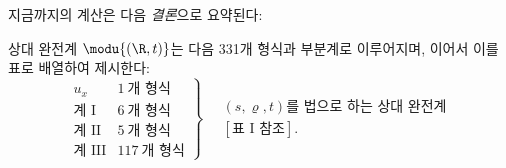 
지금까지의 계산은 다음 \emph{결론}으로 요약된다:

상대 완전계 $\modu{(\R,t)}$는 다음 331개 형식과 부분계로 이루어지며, 이어서 이를 표로 배열하여 제시한다:
\[
\left.
\begin{array}{lr}
u_x&1\ \text{개 형식}\\
\text{계 I}&6\ \text{개 형식}\\
\text{계 II}&5\ \text{개 형식}\\
\text{계 III}&117\ \text{개 형식}
\end{array}
\right\}
\quad
\begin{gathered}
(s,\varrho,t)\text{를 법으로 하는 상대 완전계}\\
[\text{표 I 참조}].
\end{gathered}
\]
